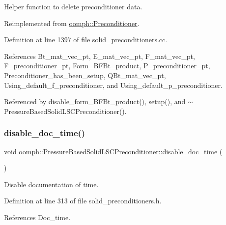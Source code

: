 Helper function to delete preconditioner data. 



Reimplemented from \hyperlink{classoomph_1_1Preconditioner_a46c31c416829bedcd9db238431262027}{oomph\+::\+Preconditioner}.



Definition at line 1397 of file solid\+\_\+preconditioners.\+cc.



References Bt\+\_\+mat\+\_\+vec\+\_\+pt, E\+\_\+mat\+\_\+vec\+\_\+pt, F\+\_\+mat\+\_\+vec\+\_\+pt, F\+\_\+preconditioner\+\_\+pt, Form\+\_\+\+B\+F\+Bt\+\_\+product, P\+\_\+preconditioner\+\_\+pt, Preconditioner\+\_\+has\+\_\+been\+\_\+setup, Q\+Bt\+\_\+mat\+\_\+vec\+\_\+pt, Using\+\_\+default\+\_\+f\+\_\+preconditioner, and Using\+\_\+default\+\_\+p\+\_\+preconditioner.



Referenced by disable\+\_\+form\+\_\+\+B\+F\+Bt\+\_\+product(), setup(), and $\sim$\+Pressure\+Based\+Solid\+L\+S\+C\+Preconditioner().

\mbox{\label{classoomph_1_1PressureBasedSolidLSCPreconditioner_a6828b0336e94e6acaaef7623f6425792}} 
\subsubsection{\texorpdfstring{disable\+\_\+doc\+\_\+time()}{disable\_doc\_time()}}
{\footnotesize\ttfamily void oomph\+::\+Pressure\+Based\+Solid\+L\+S\+C\+Preconditioner\+::disable\+\_\+doc\+\_\+time (\begin{DoxyParamCaption}{ }\end{DoxyParamCaption})\hspace{0.3cm}{\ttfamily [inline]}}



Disable documentation of time. 



Definition at line 313 of file solid\+\_\+preconditioners.\+h.



References Doc\+\_\+time.

